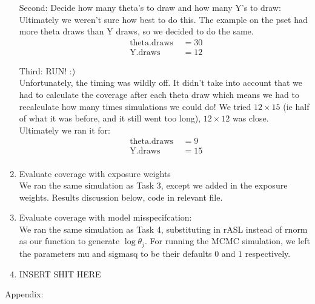 \documentclass[paper=a4, fontsize=11pt]{scrartcl}
\begin{document}
\begin{enumerate}
      Second: Decide how many theta's to draw and how many Y's to draw: \\
        Ultimately we weren't sure how best to do this. The example on the pset had more theta draws than Y draws, so we decided to do the same.
        \begin{align*}
          \text{ theta.draws } &= 30 \\
          \text{ Y.draws } &= 12
        \end{align*}

      Third: RUN! :) \\

      Unfortunately, the timing was wildly off. It didn't take into account that we had to calculate the coverage after each theta draw which means we had to recalculate how many times simulations we could do! We tried 
      $12 \times 15$ (ie half of what it was before, and it still went too long), $12 \times 12$ was close. Ultimately we ran it for:
      \begin{align*}
        \text{ theta.draws } &= 9 \\
        \text{ Y.draws} &= 15 \\
      \end{align*}

    \item Evaluate coverage with exposure weights \\

      We ran the same simulation as Task 3, except we added in the exposure weights. Results discussion below, code in relevant file.
    \item Evaluate coverage with model misspecifcation: \\

      We ran the same simulation as Task 4, substituting in rASL instead of rnorm as our function to generate $\log{\theta_j}$. For running the MCMC simulation, we left the parameters mu and sigmasq to be their defaults $0$ and $1$ respectively.
    \item INSERT SHIT HERE
  \end{enumerate}
Appendix: \\
\end{document}
